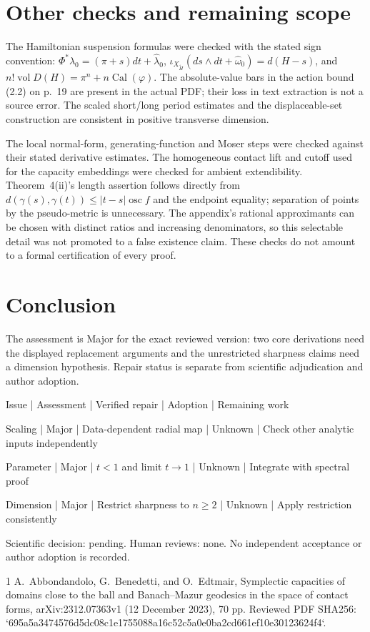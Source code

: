 \documentclass[10pt]{article}
\begin{document}
\section*{Other checks and remaining scope}
The Hamiltonian suspension formulas were checked with the stated sign convention: \(\Phi^*\lambda_0=(\pi+s)dt+\widehat\lambda_0\), \(\iota_{X_{\widetilde H}}(ds\wedge dt+\widehat\omega_0)=d(H-s)\), and \(n!\operatorname{vol}D(H)=\pi^n+n\operatorname{Cal}(\varphi)\). The absolute-value bars in the action bound (2.2) on p. 19 are present in the actual PDF; their loss in text extraction is not a source error. The scaled short/long period estimates and the displaceable-set construction are consistent in positive transverse dimension.\par
The local normal-form, generating-function and Moser steps were checked against their stated derivative estimates. The homogeneous contact lift and cutoff used for the capacity embeddings were checked for ambient extendibility. Theorem 4(ii)’s length assertion follows directly from \(d(\gamma(s),\gamma(t))\le|t-s|\operatorname{osc}f\) and the endpoint equality; separation of points by the pseudo-metric is unnecessary. The appendix’s rational approximants can be chosen with distinct ratios and increasing denominators, so this selectable detail was not promoted to a false existence claim. These checks do not amount to a formal certification of every proof.\par
\section*{Conclusion}
The assessment is Major for the exact reviewed version: two core derivations need the displayed replacement arguments and the unrestricted sharpness claims need a dimension hypothesis. Repair status is separate from scientific adjudication and author adoption.\par
Issue | Assessment | Verified repair | Adoption | Remaining work\par
Scaling | Major | Data-dependent radial map | Unknown | Check other analytic inputs independently\par
Parameter | Major | \(t<1\) and limit \(t\to1\) | Unknown | Integrate with spectral proof\par
Dimension | Major | Restrict sharpness to \(n\ge2\) | Unknown | Apply restriction consistently\par
Scientific decision: pending. Human reviews: none. No independent acceptance or author adoption is recorded.\par
1 A. Abbondandolo, G. Benedetti, and O. Edtmair, Symplectic capacities of domains close to the ball and Banach–Mazur geodesics in the space of contact forms, arXiv:2312.07363v1 (12 December 2023), 70 pp. Reviewed PDF SHA256: `695a5a3474576d5dc08c1e1755088a16c52c5a0e0ba2cd661ef10e30123624f4`.\par
\end{document}
